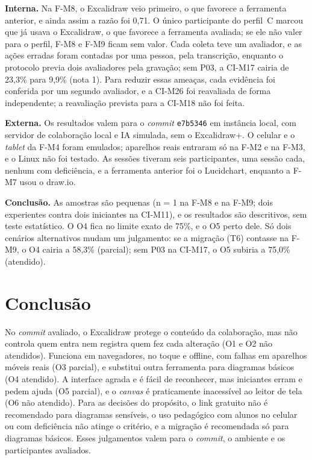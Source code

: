 \documentclass[conference]{IEEEtran}
\begin{document}
\textbf{Interna.} Na F-M8, o Excalidraw veio primeiro, o que favorece a
ferramenta anterior, e ainda assim a razão foi 0,71. O único participante do
perfil~C marcou que já usava o Excalidraw, o que favorece a ferramenta
avaliada; se ele não valer para o perfil, F-M8 e F-M9 ficam sem valor. Cada
coleta teve um avaliador, e as ações erradas foram contadas por uma pessoa,
pela transcrição, enquanto o protocolo previa dois avaliadores pela gravação;
sem P03, a CI-M17 cairia de 23,3\% para 9,9\% (nota 1). Para reduzir essas
ameaças, cada evidência foi conferida por um segundo avaliador, e a CI-M26 foi
reavaliada de forma independente; a reavaliação prevista para a CI-M18 não foi
feita.

\textbf{Externa.} Os resultados valem para o \textit{commit} \texttt{e7b5346}
em instância local, com servidor de colaboração local e IA simulada, sem o
Excalidraw+. O celular e o \textit{tablet} da F-M4 foram emulados; aparelhos
reais entraram só na F-M2 e na F-M3, e o Linux não foi testado. As sessões
tiveram seis participantes, uma sessão cada, nenhum com deficiência, e a
ferramenta anterior foi o Lucidchart, enquanto a F-M7 usou o draw.io.

\textbf{Conclusão.} As amostras são pequenas (n = 1 na F-M8 e na F-M9; dois
experientes contra dois iniciantes na CI-M11), e os resultados são
descritivos, sem teste estatístico. O O4 fica no limite exato de 75\%, e o
O5 perto dele. Só dois cenários alternativos mudam um julgamento: se a
migração (T6) contasse na F-M9, o O4 cairia a 58,3\% (parcial); sem P03 na
CI-M17, o O5 subiria a 75,0\% (atendido).

\section{Conclusão}
\label{sec:conclusao}
No \textit{commit} avaliado, o Excalidraw protege o conteúdo da colaboração,
mas não controla quem entra nem registra quem fez cada alteração (O1 e O2
não atendidos). Funciona em navegadores, no toque e offline, com falhas em
aparelhos móveis reais (O3 parcial), e substitui outra ferramenta para
diagramas básicos (O4 atendido). A interface agrada e é fácil de reconhecer,
mas iniciantes erram e pedem ajuda (O5 parcial), e o \textit{canvas} é
praticamente inacessível ao leitor de tela (O6 não atendido). Para as
decisões do propósito, o link gratuito não é recomendado para diagramas
sensíveis, o uso pedagógico com alunos no celular ou com deficiência não
atinge o critério, e a migração é recomendada só para diagramas básicos.
Esses julgamentos valem para o \textit{commit}, o ambiente e os
participantes avaliados.
\end{document}
